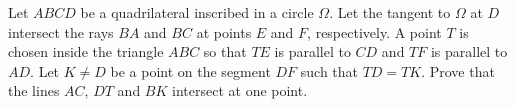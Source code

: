 Let $ABCD$ be a quadrilateral inscribed in a circle $\Omega$.
Let the tangent to $\Omega$ at $D$ intersect the rays $BA$ and $BC$ at points $E$ and $F$, respectively.
A point $T$ is chosen inside the triangle $ABC$ so that $TE$ is parallel to $CD$ and $TF$ is parallel to $AD$.
Let $K\neq D$ be a point on the segment $DF$ such that $TD=TK$.
Prove that the lines $AC$, $DT$ and $BK$ intersect at one point.
